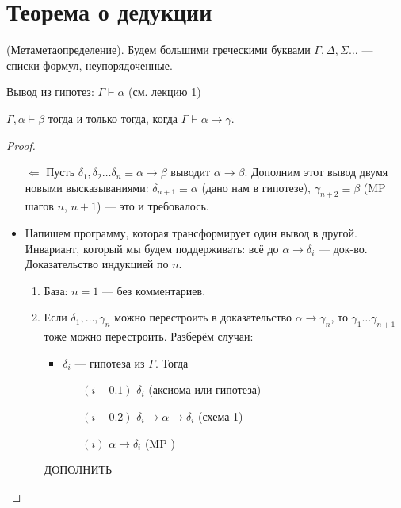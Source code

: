 \section{Теорема о дедукции}

\begin{definition}
    (Метаметаопределение).
    Будем большими греческими буквами $\Gamma, \Delta, \Sigma\ldots$ --- списки формул, неупорядоченные. 
\end{definition}

\begin{definition}
    Вывод из гипотез: $\Gamma \vdash \alpha$ (см. лекцию 1) 
\end{definition}

\begin{theorem}
    $ \Gamma, \alpha \vdash \beta$ тогда и только тогда, когда $\Gamma \vdash \alpha \to \gamma$. 
\end{theorem}

\begin{proof}
    \begin{itemize}
        \item [$\Leftarrow $] 
        Пусть $\delta_1, \delta_2\ldots \delta_n \equiv \alpha \to \beta$ выводит $\alpha \to \beta$. 
        Дополним этот вывод двумя новыми высказываниями: $\delta_{n+1} \equiv \alpha$ (дано нам в гипотезе), $\gamma_{n+2} \equiv \beta$ (MP шагов $n$, $n+1$) --- это и требовалось.
        \item Напишем программу, которая трансформирует один вывод в другой.
        Инвариант, который мы будем поддерживать: всё до $\alpha \to \delta_i $ --- док-во.
        Доказательство индукцией по $n$.
        \begin{enumerate}
            \item База: $n=1$ --- без комментариев.
            \item Если $\delta_1,\ldots, \gamma_n$ можно перестроить в доказательство $\alpha \to \gamma_n$, то $\gamma_1 \ldots \gamma_{n+1}$ тоже можно перестроить.
            Разберём случаи:
            \begin{itemize}
                \item $\delta_i$ --- гипотеза из $\Gamma$. Тогда 
                \begin{itemize}
                    \item[$(i-0.1)$] $\delta_i$ (аксиома или гипотеза)
                    \item[$(i-0.2)$] $\delta_i \to \alpha \to \delta_i$ (схема 1)
                    \item[$(i)$] $\alpha \to \delta_i$ (MP )
                \end{itemize}
            \end{itemize}
            ДОПОЛНИТЬ
        \end{enumerate}
    \end{itemize}
\end{proof}

